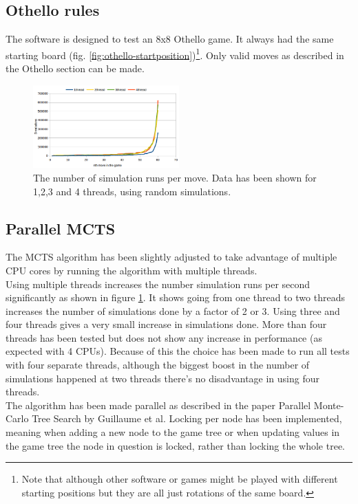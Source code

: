 \documentclass[11pt,a4paper]{article}
\begin{document}
\subsection{Othello rules}
The software is designed to test an 8x8 Othello game. It always had the same starting board (fig. \ref{fig:othello-startposition})\footnote{Note that although other software or games might be played with different starting positions but they are all just rotations of the same board.}. Only valid moves as described in the Othello section can be made.
\begin{figure}
	\centering
	\includegraphics[width=0.5\textwidth]{images/mcts-simulations-threads}
	\caption{The number of simulation runs per move. Data has been shown for 1,2,3 and 4 threads, using random simulations.}
	\label{fig:mcts-threads}
\end{figure}
\subsection{Parallel MCTS}
The MCTS algorithm has been slightly adjusted to take advantage of multiple CPU cores by running the algorithm with multiple threads.\\

Using multiple threads increases the number simulation runs per second significantly as shown in figure \ref{fig:mcts-threads}. It shows going from one thread to two threads increases the number of simulations done by a factor of 2 or 3. Using three and four threads gives a very small increase in simulations done. More than four threads has been tested but does not show any increase in performance (as expected with 4 CPUs). Because of this the choice has been made to run all tests with four separate threads, although the biggest boost in the number of simulations happened at two threads there's no disadvantage in using four threads.\\

The algorithm has been made parallel as described in the paper Parallel Monte-Carlo Tree Search by Guillaume et al\cite{chaslot2008parallel}. Locking per node has been implemented, meaning when adding a new node to the game tree or when updating values in the game tree the node in question is locked, rather than locking the whole tree.
\end{document}
